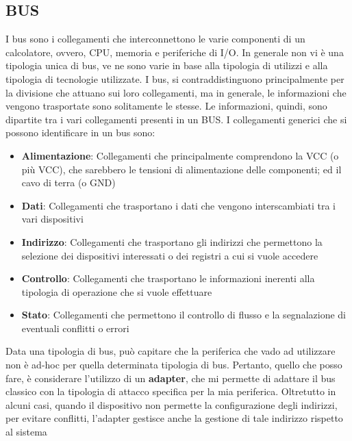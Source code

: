 \subsection{BUS}
I bus sono i collegamenti che interconnettono le varie componenti di un calcolatore, ovvero, CPU, memoria e periferiche di I/O.
In generale non vi è una tipologia unica di bus, ve ne sono varie in base alla tipologia di utilizzi e alla tipologia di tecnologie utilizzate.
I bus, si contraddistinguono principalmente per la divisione che attuano sui loro collegamenti, ma in generale, le informazioni che vengono trasportate sono solitamente le stesse.
Le informazioni, quindi, sono dipartite tra i vari collegamenti presenti in un BUS. I collegamenti generici che si possono identificare in un bus sono:
\begin{itemize}
    \item \textbf{Alimentazione}: Collegamenti che principalmente comprendono la VCC (o più VCC), che sarebbero le tensioni di alimentazione delle componenti; ed il cavo di terra (o GND)
    \item \textbf{Dati}: Collegamenti che trasportano i dati che vengono interscambiati tra i vari dispositivi
    \item \textbf{Indirizzo}: Collegamenti che trasportano gli indirizzi che permettono la selezione dei dispositivi interessati o dei registri a cui si vuole accedere
    \item \textbf{Controllo}: Collegamenti che trasportano le informazioni inerenti alla tipologia di operazione che si vuole effettuare
    \item \textbf{Stato}: Collegamenti che permettono il controllo di flusso e la segnalazione di eventuali conflitti o errori
\end{itemize}

Data una tipologia di bus, può capitare che la periferica che vado ad utilizzare non è ad-hoc per quella determinata tipologia di bus. Pertanto, quello che posso fare, è considerare l'utilizzo di un \textbf{adapter}, che mi permette di adattare il bus classico con la tipologia di attacco specifica per la mia periferica. Oltretutto in alcuni casi, quando il dispositivo non permette la configurazione degli indirizzi, per evitare conflitti, l'adapter gestisce anche la gestione di tale indirizzo rispetto al sistema

